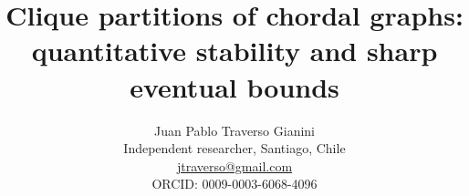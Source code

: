 \documentclass[english,11pt,a4paper]{article}
\title{Clique partitions of chordal graphs:\\quantitative stability and sharp eventual bounds}
\author{Juan Pablo Traverso Gianini\\
\small Independent researcher, Santiago, Chile\\
\small \href{mailto:jtraverso@gmail.com}{jtraverso@gmail.com}\\
\small ORCID: 0009-0003-6068-4096}
\date{}
\begin{document}
\raggedbottom
\maketitle
\end{document}
